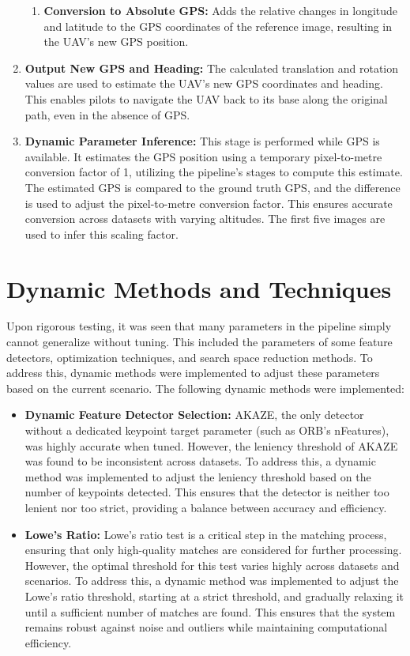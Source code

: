 \begin{enumerate}
\begin{enumerate}
        \item \textbf{Conversion to Absolute GPS:}  
        Adds the relative changes in longitude and latitude to the GPS coordinates of the reference image, resulting in the UAV's new GPS position.
    \end{enumerate}

    \item \textbf{Output New GPS and Heading:}  
    The calculated translation and rotation values are used to estimate the UAV's new GPS coordinates and heading. This enables pilots to navigate the UAV back to its base along the original path, even in the absence of GPS.

    \item \textbf{Dynamic Parameter Inference:}  
    This stage is performed while GPS is available. It estimates the GPS position using a temporary pixel-to-metre conversion factor of 1, utilizing the pipeline's stages to compute this estimate. The estimated GPS is compared to the ground truth GPS, and the difference is used to adjust the pixel-to-metre conversion factor. This ensures accurate conversion across datasets with varying altitudes. The first five images are used to infer this scaling factor.


\end{enumerate}


\section{Dynamic Methods and Techniques}
Upon rigorous testing, it was seen that many parameters in the pipeline simply cannot generalize without tuning. This included the parameters of some feature detectors, optimization techniques, and search space reduction methods. To address this, dynamic methods were implemented to adjust these parameters based on the current scenario. The following dynamic methods were implemented:

\begin{itemize}
    \item \textbf{Dynamic Feature Detector Selection:} AKAZE, the only detector without a dedicated keypoint target parameter (such as ORB's nFeatures), was highly accurate when tuned. However, the leniency threshold of AKAZE was found to be inconsistent across datasets. To address this, a dynamic method was implemented to adjust the leniency threshold based on the number of keypoints detected. This ensures that the detector is neither too lenient nor too strict, providing a balance between accuracy and efficiency.
    \item \textbf{Lowe's Ratio:} Lowe's ratio test is a critical step in the matching process, ensuring that only high-quality matches are considered for further processing. However, the optimal threshold for this test varies highly across datasets and scenarios. To address this, a dynamic method was implemented to adjust the Lowe's ratio threshold, starting at a strict threshold, and gradually relaxing it until a sufficient number of matches are found. This ensures that the system remains robust against noise and outliers while maintaining computational efficiency.
\end{itemize}

